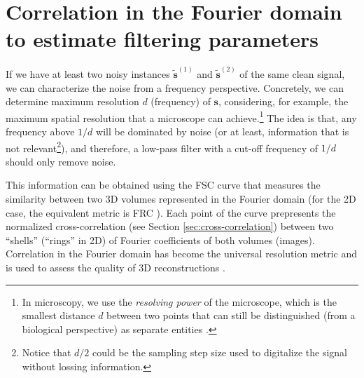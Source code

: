 
\section{Correlation in the Fourier domain to estimate filtering parameters}
\label{sec:fourier_correlation}

If we have at least two noisy instances $\tilde{\mathbf{s}}^{(1)}$ and
$\tilde{\mathbf{s}}^{(2)}$ of the same clean signal, we can characterize
the noise from a frequency perspective. Concretely, we can determine
maximum resolution $d$ (frequency) of $\mathbf{s}$, considering, for
example, the maximum spatial resolution that a microscope can
achieve.\footnote{In microscopy, we use the \emph{resolving power} of
  the microscope, which is the smallest distance $d$ between two
  points that can still be distinguished (from a biological
  perspective) as separate entities
  \cite{nieuwenhuizen2013measuring}.} The idea is that, any frequency
above $1/d$ will be dominated by noise (or at least, information that
is not relevant\footnote{Notice that $d/2$ could be the sampling step
  size used to digitalize the signal without lossing information.}),
and therefore, a low-pass filter with a cut-off frequency of $1/d$
should only remove noise.

This information can be obtained using the \gls{FSC} curve that
measures the similarity between two 3D volumes represented in the
Fourier domain \cite{harauz1986exact,verbeke2024self} (for the 2D
case, the equivalent metric is \gls{FRC}
\cite{van1982arthropod}). Each point of the curve prepresents the
normalized cross-correlation (see Section \ref{sec:cross-correlation})
between two ``shells'' (``rings'' in 2D) of Fourier coefficients of
both volumes (images). Correlation in the Fourier domain has become
the universal resolution metric and is used to assess the quality of
3D reconstructions \cite{rosenthal2003optimal,scheres2012prevention}.

